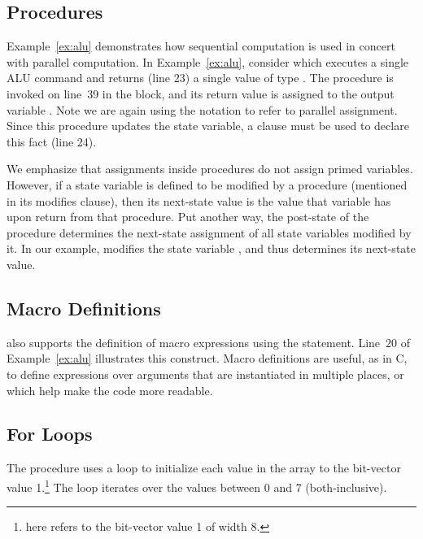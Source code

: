 \subsection{Procedures}
Example~\ref{ex:alu} demonstrates how sequential computation is used in concert with parallel computation. %
In Example~\ref{ex:alu}, consider   which executes a single ALU command and returns (line 23) a single value of type . The procedure is invoked on line~39 in the  block, and its return value is assigned to the output variable . Note we are again using the notation  to refer to parallel assignment. Since this procedure updates the  state variable, a  clause must be used to declare this fact (line 24).

We emphasize that assignments inside procedures do not assign primed
variables. However, if a state variable is defined to be modified by
a procedure (mentioned in its modifies clause), then its next-state
value is the value that variable has upon return from that procedure.
Put another way, the post-state of the procedure determines the
next-state assignment of all state variables modified by it.
In our example,   modifies
the state variable , and thus determines its next-state
value.

\subsection{Macro Definitions}

\uclid{} also supports the definition of macro expressions using
the  statement. 
Line~20 of Example~\ref{ex:alu} illustrates this construct.
Macro definitions are useful, as in C, to define expressions
over arguments that are instantiated in multiple places, or
which help make the code more readable.


\subsection{For Loops}
The procedure  uses a  loop to initialize each value in the array  to the bit-vector value 1.\footnote{ here refers to the bit-vector value 1 of width 8.} The loop iterates over the values between 0 and 7 (both-inclusive).

